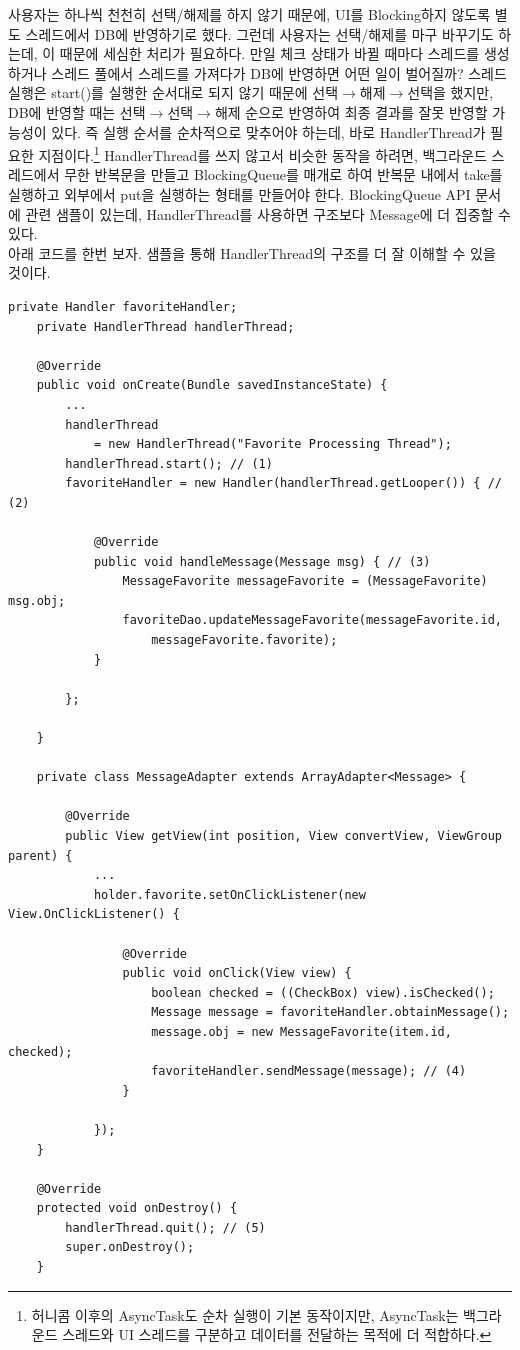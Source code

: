 사용자는 하나씩 천천히 선택/해제를 하지 않기 때문에, UI를 Blocking하지 않도록 별도 스레드에서 DB에 반영하기로 했다.
그런데 사용자는 선택/해제를 마구 바꾸기도 하는데, 이 때문에 세심한 처리가 필요하다.
만일 체크 상태가 바뀔 때마다 스레드를 생성하거나 스레드 풀에서 스레드를 가져다가 DB에 반영하면 어떤 일이 벌어질까? 
스레드 실행은 start()를 실행한 순서대로 되지 않기 때문에 선택$\rightarrow$해제$\rightarrow$선택을 했지만, DB에 반영할 때는 선택$\rightarrow$선택$\rightarrow$해제 순으로 반영하여 최종 결과를 잘못 반영할 가능성이 있다. 
즉 실행 순서를 순차적으로 맞추어야 하는데, 바로 HandlerThread가 필요한 지점이다.\footnote{허니콤 이후의 AsyncTask도 순차 실행이 기본 동작이지만, AsyncTask는 백그라운드 스레드와 UI 스레드를 구분하고 데이터를 전달하는 목적에 더 적합하다.}
HandlerThread를 쓰지 않고서 비슷한 동작을 하려면, 백그라운드 스레드에서 무한 반복문을 만들고 BlockingQueue를 매개로 하여 반복문 내에서 take를 실행하고 외부에서 put을 실행하는 형태를 만들어야 한다.
BlockingQueue API 문서에 관련 샘플이 있는데, HandlerThread를 사용하면 구조보다 Message에 더 집중할 수 있다.\\

아래 코드를 한번 보자. 샘플을 통해 HandlerThread의 구조를 더 잘 이해할 수 있을 것이다.
\begin{lstlisting}[frame=single] 
 	private Handler favoriteHandler;
    private HandlerThread handlerThread;

    @Override
    public void onCreate(Bundle savedInstanceState) {
       	... 
       	handlerThread 
       		= new HandlerThread("Favorite Processing Thread");
        handlerThread.start(); // (1)
        favoriteHandler = new Handler(handlerThread.getLooper()) { // (2)

            @Override
            public void handleMessage(Message msg) { // (3)
                MessageFavorite messageFavorite = (MessageFavorite) msg.obj;
                favoriteDao.updateMessageFavorite(messageFavorite.id, 
                	messageFavorite.favorite);
            }

        };
        
	}

	private class MessageAdapter extends ArrayAdapter<Message> {
		
		@Override
        public View getView(int position, View convertView, ViewGroup parent) {	
        	...
			holder.favorite.setOnClickListener(new View.OnClickListener() {

                @Override
                public void onClick(View view) {
                    boolean checked = ((CheckBox) view).isChecked();
                    Message message = favoriteHandler.obtainMessage();
                    message.obj = new MessageFavorite(item.id, checked);
                    favoriteHandler.sendMessage(message); // (4)
                }

            });
	}
	
	@Override
    protected void onDestroy() { 
        handlerThread.quit(); // (5)
        super.onDestroy();
    }
\end{lstlisting}

